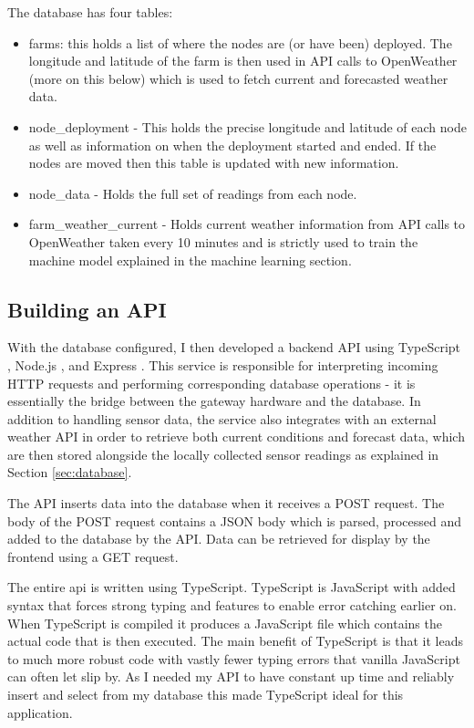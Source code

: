 The database has four tables:

\begin{itemize}     
      \item farms: this holds a list of where the nodes are (or have been)
      deployed. The longitude and latitude of the farm is then used in API calls
      to OpenWeather (more on this below) which is used to fetch current and
      forecasted weather data.
      \item node\_deployment - This holds the precise longitude and latitude of
      each node as well as information on when the deployment started and ended.
      If the nodes are moved then this table is updated with new information.     
      \item node\_data - Holds the full set of readings from each node.    
      \item farm\_weather\_current - Holds current weather information from API
      calls to OpenWeather taken every 10 minutes and is strictly used to train
      the machine model explained in the machine learning section.
 \end{itemize} 


\subsection{Building an API}

With the database configured, I then developed a backend API using TypeScript
\cite{typescript}, Node.js \cite{nodejs}, and Express \cite{express}. This
service is responsible for interpreting incoming HTTP requests and performing
corresponding database operations - it is essentially the bridge between the
gateway hardware and the database. In addition to handling sensor data, the
service also integrates with an external weather API in order to retrieve both
current conditions and forecast data, which are then stored alongside the
locally collected sensor readings as explained in Section \ref{sec:database}.

The API inserts data into the database when it receives a POST request. The body
of the POST request contains a JSON body which is parsed, processed and added to
the database by the API. Data can be retrieved for display by the frontend using
a GET request.

The entire api is written using TypeScript. TypeScript is JavaScript with added
syntax that forces strong typing and features to enable error catching earlier
on. When TypeScript is compiled it produces a JavaScript file which contains the
actual code that is then executed. The main benefit of TypeScript is that it
leads to much more robust code with vastly fewer typing errors that vanilla
JavaScript can often let slip by. As I needed my API to have constant up time
and reliably insert and select from my database this made TypeScript ideal for
this application.

